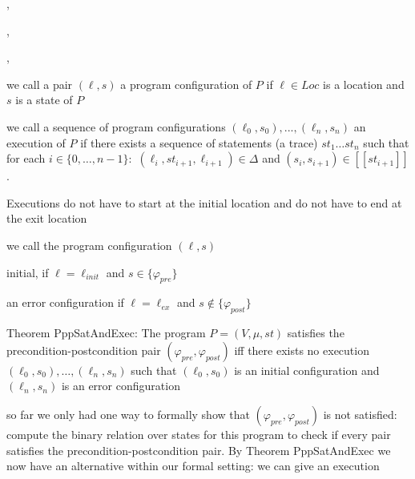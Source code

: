 \documentclass[landscape, a4paper]{article}
\begin{document}
\begin{minipage}[t]{0.2\linewidth}
\begin{betterlist}
\begin{betterlist}
		\end{betterlist}
		\item {}, 
		\item {}, 
		\item {}, 
		\item \color{orange}we call a pair $(\ell, s)$ a \alert{program configuration} of $P$ if $\ell \in Loc$ is a location and $s$ is a state of $P$\color{black}
		\item \color{orange}we call a sequence of program configurations $(\ell_0, s_0), . . . , (\ell_n, s_n)$ an \alert{execution} of $P$ if there exists a sequence of statements (a trace) $st_1 \ldots st_n$ such that for each $i \in \{0, \ldots, n−1\}:$ $(\ell_i, st_{i+1}, \ell_{i+1}) \in \Delta$ and $(s_i, s_{i+1}) \in [[st_{i+1}]]$. \color{black}
		\begin{betterlist}
			\item Executions do not have to start at the initial location and do not have to end at the exit location
		\end{betterlist}
		\item \color{orange}we call the program configuration $(\ell, s)$
		\begin{betterlist}
			\item \alert{initial}, if $\ell= \ell_{init}$ and $s \in\{\varphi_{pre}\}$
			\item an \alert{error configuration} if $\ell= \ell_{ex}$ and $s \not\in \{\varphi_{post}\}$
		\end{betterlist}\color{black}
		\item \color{orange}\alert{Theorem PppSatAndExec:} The program $P = (V, \mu, st)$ satisfies the precondition-postcondition pair $(\varphi_{pre}, \varphi_{post})$ iff there exists no execution $(\ell_0, s_0), \ldots, (\ell_n, s_n)$ such that $(\ell_0, s_0)$ is an initial configuration and $(\ell_n, s_n)$ is an error configuration\color{black}
		\begin{betterlist}
			\item so far we only had one way to formally show that $(\varphi_{pre}, \varphi_{post})$ is not satisfied: compute the binary relation over states for this program to check if every pair satisfies the precondition-postcondition pair. By Theorem PppSatAndExec we now have an alternative within our formal setting: we can give an execution
			\item {}

\end{betterlist}
\end{betterlist}
\end{minipage}
\end{document}
